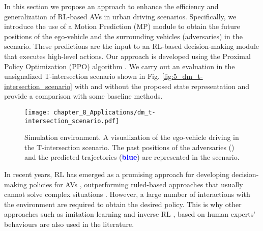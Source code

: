 In this section we propose an approach to enhance the efficiency and generalization of RL-based AVs in urban driving scenarios. Specifically, we introduce the use of a Motion Prediction (MP) module to obtain the future positions of the ego-vehicle and the surrounding vehicles (adversaries) in the scenario. These predictions are the input to an RL-based decision-making module that executes high-level actions. Our approach is developed using the Proximal Policy Optimization (PPO) algorithm  \cite{Schulman2017}.  We carry out an evaluation in the unsignalized T-intersection scenario shown in Fig. \ref{fig:5_dm_t-intersection_scenario} with and without the proposed state representation and provide a comparison with some baseline methods.

\begin{figure}[h]
	\centering
	\texttt{[image: chapter\_8\_Applications/dm\_t-intersection\_scenario.pdf]}
	\caption{Simulation environment. A visualization of the ego-vehicle driving in the T-intersection scenario. The past positions of the adversaries (\textbf{\color{YellowOrange}{yellow}}) and the predicted trajectories (\textbf{\textcolor{blue}{blue}}) are represented in the scenario.}
	\label{fig:chapter_8_Applications/dm_t-intersection_scenario}
\end{figure}

In recent years, RL has emerged as a promising approach for developing decision-making policies for AVs \cite{Mnih2015}, outperforming ruled-based approaches that usually cannot solve complex situations \cite{Zhu2019}. However, a large number of interactions with the environment are required to obtain the desired policy. This is why other approaches such as imitation learning \cite{SilverHuangEtAl16nature} and inverse RL \cite{Ross2010}, based on human experts' behaviours are also used in the literature. 

